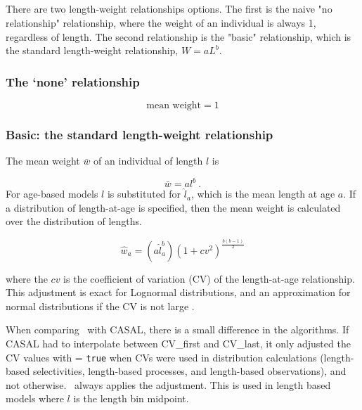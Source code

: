 \ifAgeBased

\else

\fi %

\subsection{}\label{sec:MeanWeight}\label{sec:LengthWeight}

There are two length-weight relationships options. The first is the naive "no relationship" relationship, where the weight of an individual is always 1, regardless of length. The second relationship is the "basic" relationship, which is the standard length-weight relationship, $W = aL^b$.

\subsubsection{The `none' relationship}\label{sec:LengthWeight-None}

\begin{equation}
  \text{mean weight}=1
\end{equation}

\subsubsection{Basic: the standard length-weight relationship}\label{sec:LengthWeight-Basic}

The mean weight $\bar{w}$ of an individual of length $l$ is

\begin{equation}
  \bar{w} =a l^b \ .
\end{equation}
\ifAgeBased
For age-based models \(l\) is substituted for $\hat{l}_a$, which is the mean length at age $a$. If a distribution of length-at-age is specified, then the mean weight is calculated over the distribution of lengths.

\begin{equation}\label{eq:mean_weight_with_adjustment}
	\hat{w}_a=(a\hat{l}_a^b)(1+cv^2)^{\frac{b(b-1)}{2}}
\end{equation}

where the $cv$ is the coefficient of variation (CV) of the length-at-age relationship. This adjustment is exact for Lognormal distributions, and an approximation for normal distributions if the CV is not large \citep{1388}. 

When comparing \CNAME\ with CASAL, there is a small difference in the algorithms. If CASAL had to interpolate between CV\_first and CV\_last, it only adjusted the CV values with  = \texttt{true} when CVs were used in distribution calculations (length-based selectivities, length-based processes, and length-based observations), and not otherwise. \CNAME\ always applies the adjustment.
\else
This is used in length based models where \(l\) is the length bin midpoint. 
\fi

